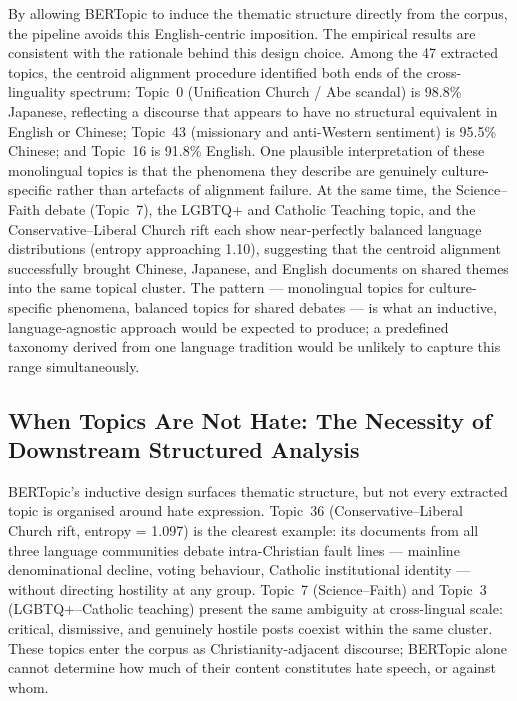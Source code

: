 \documentclass[../CLthesis.tex]{subfiles}
\begin{document}
By allowing BERTopic to induce the thematic structure directly from the corpus, the pipeline avoids this English-centric imposition. The empirical results are consistent with the rationale behind this design choice. Among the 47 extracted topics, the centroid alignment procedure identified both ends of the cross-linguality spectrum: Topic~0 (Unification Church / Abe scandal) is 98.8\% Japanese, reflecting a discourse that appears to have no structural equivalent in English or Chinese; Topic~43 (missionary and anti-Western sentiment) is 95.5\% Chinese; and Topic~16 is 91.8\% English. One plausible interpretation of these monolingual topics is that the phenomena they describe are genuinely culture-specific rather than artefacts of alignment failure. At the same time, the Science--Faith debate (Topic~7), the LGBTQ+ and Catholic Teaching topic, and the Conservative--Liberal Church rift each show near-perfectly balanced language distributions (entropy approaching 1.10), suggesting that the centroid alignment successfully brought Chinese, Japanese, and English documents on shared themes into the same topical cluster. The pattern --- monolingual topics for culture-specific phenomena, balanced topics for shared debates --- is what an inductive, language-agnostic approach would be expected to produce; a predefined taxonomy derived from one language tradition would be unlikely to capture this range simultaneously.

\subsection{When Topics Are Not Hate: The Necessity of Downstream Structured Analysis}
\label{sec:discussion-nothate}

BERTopic's inductive design surfaces thematic structure, but not every extracted topic is organised around hate expression. Topic~36 (Conservative--Liberal Church rift, entropy = 1.097) is the clearest example: its documents from all three language communities debate intra-Christian fault lines --- mainline denominational decline, voting behaviour, Catholic institutional identity --- without directing hostility at any group. Topic~7 (Science--Faith) and Topic~3 (LGBTQ+--Catholic teaching) present the same ambiguity at cross-lingual scale: critical, dismissive, and genuinely hostile posts coexist within the same cluster. These topics enter the corpus as Christianity-adjacent discourse; BERTopic alone cannot determine how much of their content constitutes hate speech, or against whom.
\end{document}
